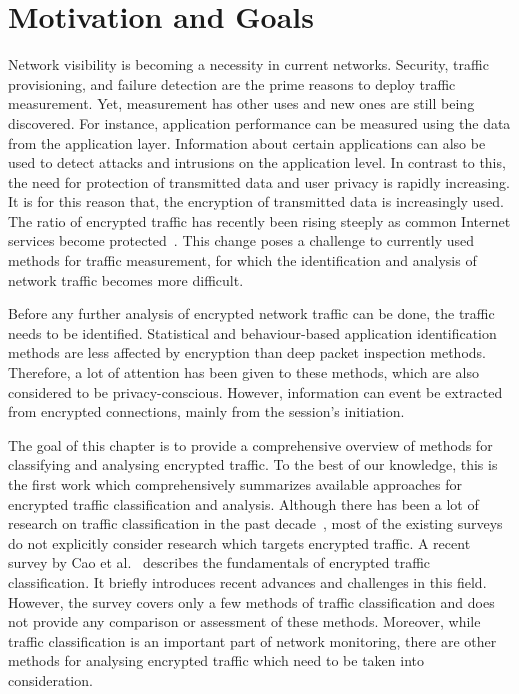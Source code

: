 \begin{chapintro}
\end{chapintro}

\newpage

\section{Motivation and Goals}\label{sec:enc-motivation}

Network visibility is becoming a necessity in current networks. Security, traffic provisioning, and failure detection are the prime reasons to deploy traffic measurement. Yet, measurement has other uses and new ones are still being discovered. For instance, application performance can be measured using the data from the application layer. Information about certain applications can also be used to detect attacks and intrusions on the application level. In contrast to this, the need for protection of transmitted data and user privacy is rapidly increasing. It is for this reason that, the encryption of transmitted data is increasingly used. The ratio of encrypted traffic has recently been rising steeply as common Internet services become protected~\cite{Sandvine-2014-Global}. This change poses a challenge to currently used methods for traffic measurement, for which the identification and analysis of network traffic becomes more difficult.

Before any further analysis of encrypted network traffic can be done, the traffic needs to be identified. Statistical and behaviour-based application identification methods are less affected by encryption than deep packet inspection methods. Therefore, a lot of attention has been given to these methods, which are also considered to be privacy-conscious. However, information can event be extracted from encrypted connections, mainly from the session's initiation.

The goal of this chapter is to provide a comprehensive overview of methods for classifying and analysing encrypted traffic. To the best of our knowledge, this is the first work which comprehensively summarizes available approaches for encrypted traffic classification and analysis. Although there has been a lot of research on traffic classification in the past decade~\cite{Dainotti-2012-Issues, Nguyen-2008-Survey, Zhang-2009-State, Callado-2009-Survey, Finsterbusch-2014-Survey}, most of the existing surveys do not explicitly consider research which targets encrypted traffic. A recent survey by Cao et al.~\cite{Cao-2014-Survey} describes the fundamentals of encrypted traffic classification. It briefly introduces recent advances and challenges in this field. However, the survey covers only a few methods of traffic classification and does not provide any comparison or assessment of these methods. Moreover, while traffic classification is an important part of network monitoring, there are other methods for analysing encrypted traffic which need to be taken into consideration. 

